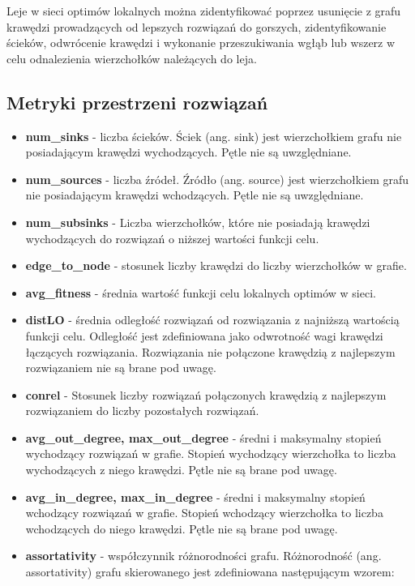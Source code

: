 Leje w sieci optimów lokalnych można zidentyfikować poprzez usunięcie z grafu krawędzi prowadzących od lepszych rozwiązań do gorszych,
zidentyfikowanie ścieków, odwrócenie krawędzi i wykonanie przeszukiwania wgłąb lub wszerz w celu odnalezienia wierzchołków należących do leja.
\subsection{Metryki przestrzeni rozwiązań}

\begin{itemize}
      \item \textbf{num\_sinks} - liczba ścieków. Ściek (ang. sink) jest wierzchołkiem grafu nie posiadającym krawędzi wychodzących.
            Pętle nie są uwzględniane.
      \item \textbf{num\_sources} - liczba źródeł. Źródło (ang. source) jest wierzchołkiem grafu nie posiadającym krawędzi wchodzących.
            Pętle nie są uwzględniane.
      \item \textbf{num\_subsinks} - Liczba wierzchołków, które nie posiadają krawędzi wychodzących do rozwiązań o niższej wartości funkcji celu.
      \item \textbf{edge\_to\_node} - stosunek liczby krawędzi do liczby wierzchołków w grafie.
      \item \textbf{avg\_fitness} - średnia wartość funkcji celu lokalnych optimów w sieci.
      \item \textbf{distLO} - średnia odległość rozwiązań od rozwiązania z najniższą wartością funkcji celu. Odległość jest zdefiniowana jako odwrotność wagi krawędzi łączących rozwiązania.
            Rozwiązania nie połączone krawędzią z najlepszym rozwiązaniem nie są brane pod uwagę.
      \item \textbf{conrel} - Stosunek liczby rozwiązań połączonych krawędzią z najlepszym rozwiązaniem do liczby pozostałych rozwiązań.
      \item \textbf{avg\_out\_degree, max\_out\_degree} - średni i maksymalny stopień wychodzący rozwiązań w grafie. Stopień wychodzący wierzchołka to liczba wychodzących z niego krawędzi. Pętle nie są brane pod uwagę.
      \item \textbf{avg\_in\_degree, max\_in\_degree} - średni i maksymalny stopień wchodzący rozwiązań w grafie. Stopień wchodzący wierzchołka to liczba wchodzących do niego krawędzi. Pętle nie są brane pod uwagę.
      \item \textbf{assortativity} - współczynnik różnorodności grafu.  Różnorodność (ang. assortativity) grafu skierowanego jest zdefiniowana następującym wzorem:

\end{itemize}

